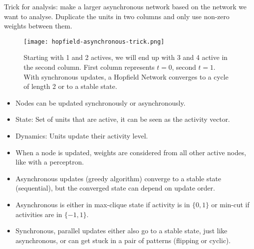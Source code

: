 \documentclass[main]{subfiles}
\begin{document}
Trick for analysis: make a larger asynchronous network based on the network we want to analyse. Duplicate the units in two columns and only use non-zero weights between them.

\begin{figure}[H]
	\centering
	\texttt{[image: hopfield-asynchronous-trick.png]}
	\caption{Starting with 1 and 2 actives, we will end up with 3 and 4 active in the second column. First column represents $t=0$, second $t=1$. With synchronous updates, a Hopfield Network converges to a cycle of length 2 or to a stable state.}
\end{figure}

\begin{itemize}[noitemsep,nolistsep]
	\item Nodes can be updated synchronously or asynchronously.
	\item State: Set of units that are active, it can be seen as the activity vector.
	\item Dynamics: Units update their activity level.
	\item When a node is updated, weights are considered from all other active nodes, like with a perceptron.
	\item Asynchronous updates (greedy algorithm) converge to a stable state (sequential), but the converged state can depend on update order.
	\item Asynchronous is either in max-clique state if activity is in $\{0,1\}$ or min-cut if activities are in $\{-1,1\}$.
	\item Synchronous, parallel updates either also go to a stable state, just like asynchronous, or can get stuck in a pair of patterns (flipping or cyclic).
\end{itemize}
\end{document}
